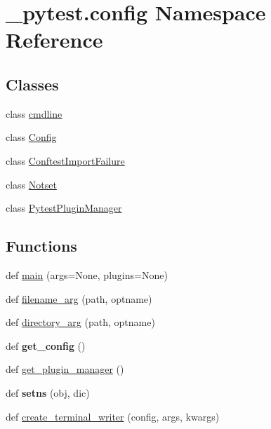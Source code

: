 \hypertarget{namespace__pytest_1_1config}{}\section{\+\_\+pytest.\+config Namespace Reference}
\label{namespace__pytest_1_1config}
\subsection*{Classes}
\begin{DoxyCompactItemize}
\item 
class \hyperlink{class__pytest_1_1config_1_1cmdline}{cmdline}
\item 
class \hyperlink{class__pytest_1_1config_1_1_config}{Config}
\item 
class \hyperlink{class__pytest_1_1config_1_1_conftest_import_failure}{Conftest\+Import\+Failure}
\item 
class \hyperlink{class__pytest_1_1config_1_1_notset}{Notset}
\item 
class \hyperlink{class__pytest_1_1config_1_1_pytest_plugin_manager}{Pytest\+Plugin\+Manager}
\end{DoxyCompactItemize}
\subsection*{Functions}
\begin{DoxyCompactItemize}
\item 
def \hyperlink{namespace__pytest_1_1config_aa283449cbd8f4350fafbace4f4c0d97a}{main} (args=None, plugins=None)
\item 
def \hyperlink{namespace__pytest_1_1config_a5b6a91e7986a9a63f55f2bedcbf10c33}{filename\+\_\+arg} (path, optname)
\item 
def \hyperlink{namespace__pytest_1_1config_a2d031894eb39f6335bed2f49405b0aff}{directory\+\_\+arg} (path, optname)
\item 
\mbox{\label{namespace__pytest_1_1config_ab6454e7ac8576333952a3d00bbfbce40}} 
def {\bfseries get\+\_\+config} ()
\item 
def \hyperlink{namespace__pytest_1_1config_ae94af57e2987e05f9de5a48fb4e5d6dd}{get\+\_\+plugin\+\_\+manager} ()
\item 
\mbox{\label{namespace__pytest_1_1config_ada2a195938193c621bef2b738c3d657b}} 
def {\bfseries setns} (obj, dic)
\item 
def \hyperlink{namespace__pytest_1_1config_a837ae06a76ed429052389abf9d761c53}{create\+\_\+terminal\+\_\+writer} (config, args, kwargs)
\end{DoxyCompactItemize}
